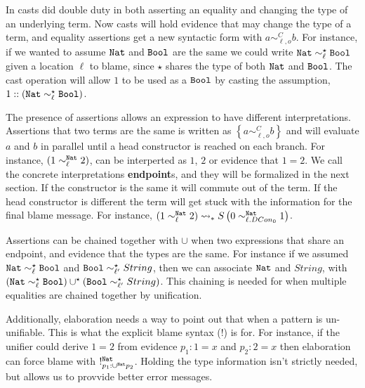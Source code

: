In  casts did double duty in both asserting an equality and changing the type of an underlying term.
Now casts will hold evidence that may change the type of a term, and equality assertions get a new syntactic form with $a\sim_{\ell,o}^{C}b$.
For instance, if we wanted to assume $\mathtt{Nat}{} $ and $\mathtt{Bool}{} $ are the same we could write $\mathtt{Nat}{} \sim_{\ell}^{\star}\mathtt{Bool}{} $ given a location $\ell$ to blame, since $\star$ shares the type of both $\mathtt{Nat}{} $ and $\mathtt{Bool}{} $.
The cast operation will allow $1$ to be used as a $\mathtt{Bool}{} $ by casting the assumption, $1::\left(\mathtt{Nat}{} \sim_{\ell}^{\star}\mathtt{Bool}{} \right)$.

The presence of assertions allows an expression to have different interpretations.
Assertions that two terms are the same is written as $\left\{ a\sim_{\ell,o}^{C}b\right\}$ and will evaluate $a$ and $b$ in parallel until a head constructor is reached on each branch. 
For instance, $\left(1 \sim_{\ell}^{\mathtt{Nat}{}} 2 \right)$, can be interperted as $1$, $2$ or evidence that $1=2$.
We call the concrete interpretations \textbf{endpoint}s, and they will be formalized in the next section.
If the constructor is the same it will commute out of the term.
If the head constructor is different the term will get stuck with the information for the final blame message.
For instance, $\left(1 \sim_{\ell}^{\mathtt{Nat}{}} 2 \right)\rightsquigarrow_{*} S\left(0 \sim_{\ell.DCon_{0}}^{\mathtt{Nat}{}} 1\right) $.


Assertions can be chained together with $\cup$ when two expressions that share an endpoint, and evidence that the types are the same.
For instance if we assumed $\mathtt{Nat}{} \sim_{\ell}^{\star}\mathtt{Bool}{} $ and $\mathtt{Bool}{} \sim_{\ell'}^{\star}String$, then we can associate $\mathtt{Nat}{} $ and $String$, with $\left(\mathtt{Nat}{} \sim_{\ell}^{\star}\mathtt{Bool}{} \right)\cup^{\star}\left(\mathtt{Bool}{} \sim_{\ell'}^{\star}String\right)$.
This chaining is needed for when multiple equalities are chained together by unification.

Additionally, elaboration needs a way to point out that when a pattern is un-unifiable.
This is what the explicit blame syntax ($!$) is for.
For instance, if the unifier could derive $1=2$ from evidence $p_{1}:1=x$ and $p_{2}:2=x$ then elaboration can force blame with $!_{p_{1}:\cup^{\mathtt{Nat}{}}p_{2}}^{\mathtt{Nat}{}}$.
Holding the type information isn't strictly needed, but allows us to provvide better error messages.
 
